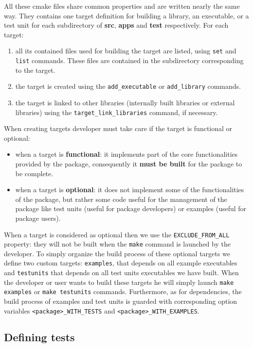 \documentclass[12pt,a4paper]{article}
\begin{document}
All these cmake files share common properties and are written nearly the same way. They contains one target definition for building a library, an executable, or a test unit for each subdirectory of \textbf{src}, \textbf{apps} and \textbf{test} respectively. For each target:
\begin{enumerate}
\item all its contained files used for building the target are listed, using \texttt{set} and \texttt{list} commands. These files are contained in the subdirectory corresponding to the target.
\item the target is created using the \texttt{add\_executable} or \texttt{add\_library} commands. 
\item the target is linked to other libraries (internally built libraries or external libraries) using the \texttt{target\_link\_libraries} command, if necessary.
\end{enumerate}

When creating targets developer must take care if the target is functional or optional:
\begin{itemize}
\item when a target is \textbf{functional}: it implements part of the core functionalities provided by the package, consequently it \textbf{must be built} for the package to be complete.
\item when a target is \textbf{optional}: it does not implement some of the functionalities of the package, but rather some code useful for the management of the package like test units (useful for package developers) or examples (useful for package users).
\end{itemize}
When a target is considered as optional then we use the \texttt{EXCLUDE\_FROM\_ALL} property: they will not be built when the \texttt{make} command is launched by the developer. To simply organize the build process of these optional targets we define two custom targets: \texttt{examples}, that depends on all example executables and \texttt{testunits} that depends on all test units executables we have built. When the developer or user wants to build these targets he will simply launch \texttt{make examples} or \texttt{make testunits} commands. Furthermore, as for dependencies, the build process of examples and test units is guarded with corresponding option variables \texttt{<package>\_WITH\_TESTS} and \texttt{<package>\_WITH\_EXAMPLES}.

\subsection{Defining tests}
\end{document}
